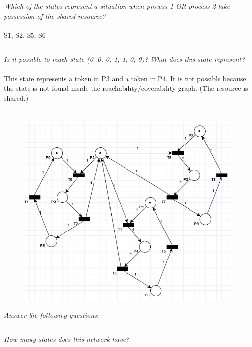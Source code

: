 \documentclass[letterpaper]{article}
\begin{document}
\subsection{}
\textit{Which of the states represent a situation when process 1 OR process 2 take possession of the shared resource?}\\ \\
S1, S2, S5, S6

\subsection{}
\textit{Is it possible to reach state (0, 0, 0, 1, 1, 0, 0)? What does this state represent?}
\\
\\This state represents a token in P3 and a token in P4. It is not possible because the state is not found inside the reachability/coverability graph. (The resource is shared.)

\section{}

\begin{figure}[H]
 \centering
 \includegraphics[width=\textwidth]{image4.png}
\end{figure}

\textit{Answer the following questions:}

\subsection{}
\textit{How many states does this network have?
}\\
\end{document}
